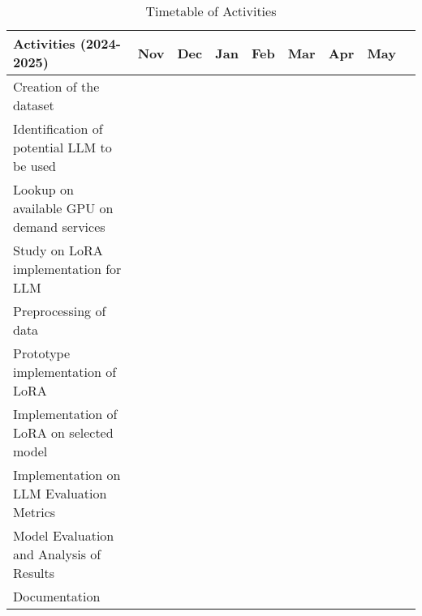 	
	\begin{table}[ht]  
		\centering
		\caption{Timetable of Activities} \vspace{0.25em}
		\begin{tabular}{|p{2in}|c|c|c|c|c|c|c|c|} \hline
			\centering Activities (2024-2025) 
			& Nov & Dec & Jan & Feb & Mar & Apr & May \\ \hline
			
			Creation of the dataset      
			&\weekone~~~ & & & & & &  \\ \hline
			
			Identification of potential LLM to be used 
			&\weekone~~~ & & & &  &  &  \\ \hline
			
			Lookup on available GPU on demand services     
			&\weekone~~~ & & & &  & &   \\ \hline
			
			Study on LoRA implementation for LLM     
			& ~\weekone & & & &  &  &  \\ \hline
			
			Preprocessing of data      
			& ~\weekthree & & & &  & &  \\ \hline
			
			Prototype implementation of LoRA 
			&~~~\weekone & \weekfour & & &  & &   \\ \hline
			
			Implementation of LoRA on selected model 
			& & &\weektwo~~ & &  &  &  \\ \hline
			
			Implementation on LLM Evaluation Metrics 
			& & &\weektwo  & &  &  &  \\ \hline
			
			Model Evaluation and Analysis of Results 
			& & & & \weekfour & &  &   \\ \hline
			
			Documentation 
			& ~~\weektwo  & \weekfour & \weekfour & \weekfour & \weekfour & &  \\ \hline
			
		\end{tabular}
		\label{tab:timetableactivities}
	\end{table}